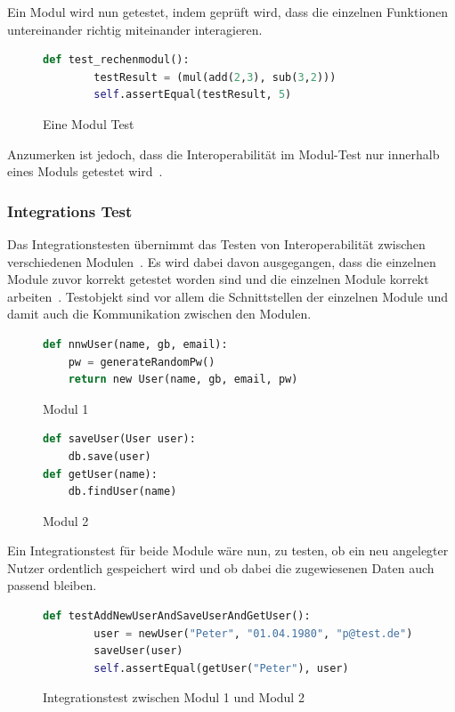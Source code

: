 Ein Modul wird nun getestet, indem geprüft wird, dass die einzelnen Funktionen untereinander richtig miteinander interagieren.

\begin{figure}[h!]
    \begin{lstlisting}[language=Python]
    def test_rechenmodul():
        testResult = (mul(add(2,3), sub(3,2)))
        self.assertEqual(testResult, 5)
    \end{lstlisting}
    \caption{Eine Modul Test}
    \label{modultest}
\end{figure}

Anzumerken ist jedoch, dass die Interoperabilität im Modul-Test nur innerhalb eines Moduls getestet wird~\cite[vgl. S. 6]{software-testing}.

\subsubsection{Integrations Test}

Das Integrationstesten übernimmt das Testen von Interoperabilität zwischen verschiedenen Modulen~\cite[vgl. S. 7]{software-testing}.
Es wird dabei davon ausgegangen, dass die einzelnen Module zuvor korrekt getestet worden sind und die einzelnen Module korrekt arbeiten~\cite[vgl. S. 7]{software-testing}.
Testobjekt sind vor allem die Schnittstellen der einzelnen Module und damit auch die Kommunikation zwischen den Modulen.

\begin{figure}[h!]
    \begin{lstlisting}[language=Python]
def nnwUser(name, gb, email):
    pw = generateRandomPw()
    return new User(name, gb, email, pw)
    \end{lstlisting}
    \caption{Modul 1}
    \label{modul1}
\end{figure}

\begin{figure}[h!]
    \begin{lstlisting}[language=Python]
def saveUser(User user):
    db.save(user)
def getUser(name):
    db.findUser(name)
    \end{lstlisting}
    \caption{Modul 2}
    \label{modul2}
\end{figure}

Ein Integrationstest für beide Module wäre nun, zu testen, ob ein neu angelegter Nutzer ordentlich gespeichert wird und ob dabei die zugewiesenen Daten
auch passend bleiben.

\begin{figure}[h!]
    \begin{lstlisting}[language=Python]
def testAddNewUserAndSaveUserAndGetUser():
        user = newUser("Peter", "01.04.1980", "p@test.de")
        saveUser(user)
        self.assertEqual(getUser("Peter"), user)
    \end{lstlisting}
    \caption{Integrationstest zwischen Modul 1 und Modul 2}
    \label{integtest}
\end{figure}

